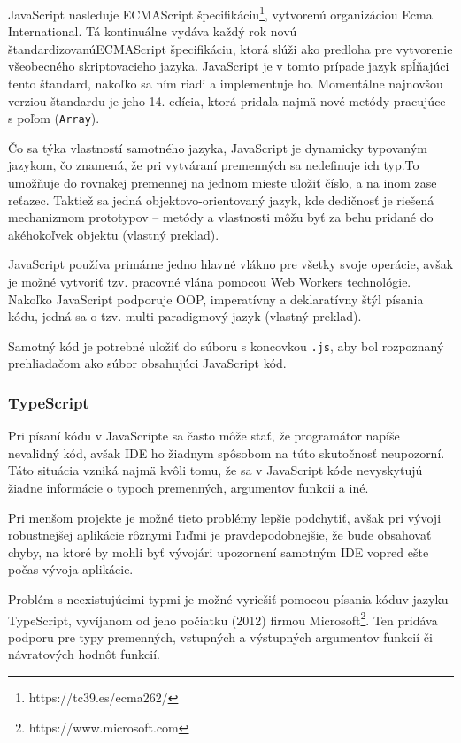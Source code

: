 JavaScript nasleduje ECMAScript špecifikáciu\footnote{https://tc39.es/ecma262/}, vytvorenú organizáciou Ecma International. Tá kontinuálne vydáva každý rok novú štandardizovanú\newline ECMAScript špecifikáciu, ktorá slúži ako predloha pre vytvorenie všeobecného skriptovacieho jazyka. JavaScript je v tomto prípade jazyk spĺňajúci tento štandard, nakoľko sa ním riadi a implementuje ho. Momentálne najnovšou verziou štandardu je jeho 14. edícia, ktorá pridala najmä nové metódy pracujúce s poľom (\texttt{Array}).

Čo sa týka vlastností samotného jazyka, JavaScript je dynamicky typovaným jazykom, čo znamená, že pri vytváraní premenných sa nedefinuje ich typ.\newline To umožňuje do rovnakej premennej na jednom mieste uložiť číslo, a na inom zase reťazec. Taktiež sa jedná objektovo-orientovaný jazyk, kde dedičnosť je riešená mechanizmom prototypov -- metódy a vlastnosti môžu byť za behu pridané do akéhokoľvek objektu \cite{ecmascript_specification} (vlastný preklad).

JavaScript používa primárne jedno hlavné vlákno pre všetky svoje operácie, avšak je možné vytvoriť tzv. pracovné vlána pomocou Web Workers technológie. Nakoľko JavaScript podporuje OOP, imperatívny a deklaratívny štýl písania kódu, jedná sa o tzv. multi-paradigmový jazyk \cite{ecmascript_specification} (vlastný preklad).

Samotný kód je potrebné uložiť do súboru s koncovkou \texttt{.js}, aby bol rozpoznaný prehliadačom ako súbor obsahujúci JavaScript kód.

\subsubsection {TypeScript}
Pri písaní kódu v JavaScripte sa často môže stať, že programátor napíše nevalidný kód, avšak IDE ho žiadnym spôsobom na túto skutočnosť neupozorní. Táto situácia vzniká najmä kvôli tomu, že sa v JavaScript kóde nevyskytujú žiadne informácie o typoch premenných, argumentov funkcií a iné.

Pri menšom projekte je možné tieto problémy lepšie podchytiť, avšak pri vývoji robustnejšej aplikácie rôznymi ľuďmi je pravdepodobnejšie, že bude obsahovať chyby, na ktoré by mohli byť vývojári upozornení samotným IDE vopred ešte počas vývoja aplikácie.

Problém s neexistujúcimi typmi je možné vyriešiť pomocou písania kódu\newline v jazyku TypeScript, vyvíjanom od jeho počiatku (2012) firmou Microsoft\footnote{https://www.microsoft.com}. Ten pridáva podporu pre typy premenných, vstupných a výstupných argumentov funkcií či návratových hodnôt funkcií.

